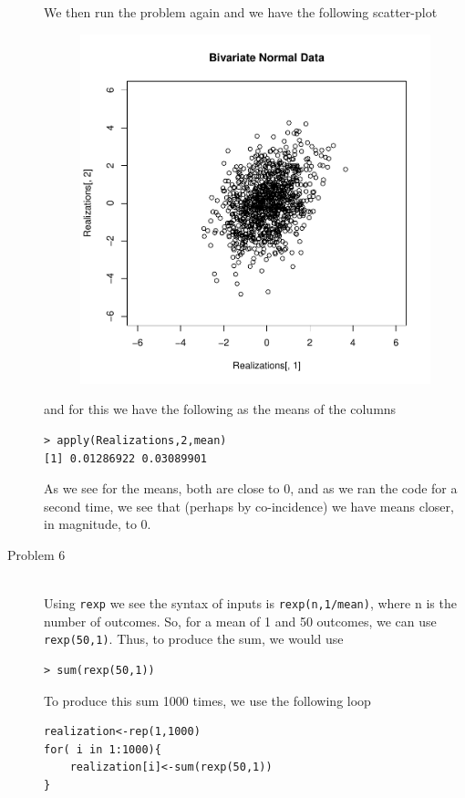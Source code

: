 \documentclass[10pt]{article}
\begin{document}
\begin{description}
\begin{lstlisting}[frame=trBL]
\end{lstlisting}
We then run the problem again and we have the following scatter-plot
\begin{figure}[ht!]
\centering
\includegraphics[width=15cm]{../Problem5Again.pdf}
\end{figure}
and for this we have the following as the means of the columns
\begin{lstlisting}[frame=trBL]
> apply(Realizations,2,mean)
[1] 0.01286922 0.03089901
\end{lstlisting}
As we see for the means, both are close to 0, and as we ran the code for a second time, we see that (perhaps by co-incidence) we have means closer, in magnitude, to 0.
\item[Problem 6]\hfill\\
Using \verb+rexp+ we see the syntax of inputs is \verb+rexp(n,1/mean)+, where n is the number of outcomes. So, for a mean of 1 and 50 outcomes, we can use \verb+rexp(50,1)+. Thus, to produce the sum, we would use 
\begin{lstlisting}[frame=trBL]
> sum(rexp(50,1))
\end{lstlisting}
To produce this sum 1000 times, we use the following loop
\begin{lstlisting}[frame=trBL]
realization<-rep(1,1000)
for( i in 1:1000){
	realization[i]<-sum(rexp(50,1))
}
\end{lstlisting}

\end{description}
\end{document}
